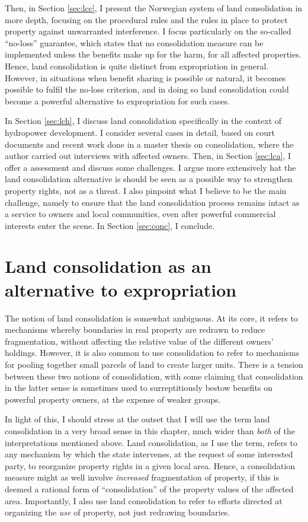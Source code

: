 Then, in Section \ref{sec:lcc}, I present the Norwegian system of land consolidation in more depth, focusing on the procedural rules and the rules in place to protect property against unwarranted interference. I focus particularly on the so-called ``no-loss'' guarantee, which states that no consolidation measure can be implemented unless the benefits make up for the harm, for all affected properties. Hence, land consolidation is quite distinct from expropriation in general. However, in situations when benefit sharing is possible or natural, it becomes possible to fulfil the no-loss criterion, and in doing so land consolidation could become a powerful alternative to expropriation for such cases. 

In Section \ref{sec:lch}, I discuss land consolidation specifically in the context of hydropower development. I consider several cases in detail, based on court documents and recent work done in a master thesis on consolidation, where the author carried out interviews with affected owners. Then, in Section \ref{sec:lca}, I offer a assessment and discuss some challenges. I argue more extensively hat the land consolidation alternative is should be seen as a possible way to strengthen property rights, not as a threat. I also pinpoint what I believe to be the main challenge, namely to ensure that the land consolidation process remains intact as a service to owners and local communities, even after powerful commercial interests enter the scene. In Section \ref{sec:conc}, I conclude.

\section{Land consolidation as an alternative to expropriation}\label{sec:lce}

The notion of land consolidation is somewhat ambiguous. At its core, it refers to  mechanisms whereby boundaries in real property are redrawn to reduce fragmentation, without affecting the relative value of the different owners' holdings. However, it is also common to use consolidation to refer to mechanisms for pooling together small parcels of land to create larger units. There is a tension between these two notions of consolidation, with some claiming that consolidation in the latter sense is sometimes used to surreptitiously bestow benefits on powerful property owners, at the expense of weaker groups.

In light of this, I should stress at the outset that I will use the term land consolidation in a very broad sense in this chapter, much wider than {\it both} of the interpretations mentioned above. Land consolidation, as I use the term, refers to any mechanism by which the state intervenes, at the request of some interested party, to reorganize property rights in a given local area. Hence, a consolidation measure might as well involve {\it increased} fragmentation of property, if this is deemed a rational form of ``consolidation'' of the property values of the affected area. Importantly, I also use land consolidation to refer to efforts directed at organizing the {\it use} of property, not just redrawing boundaries.

